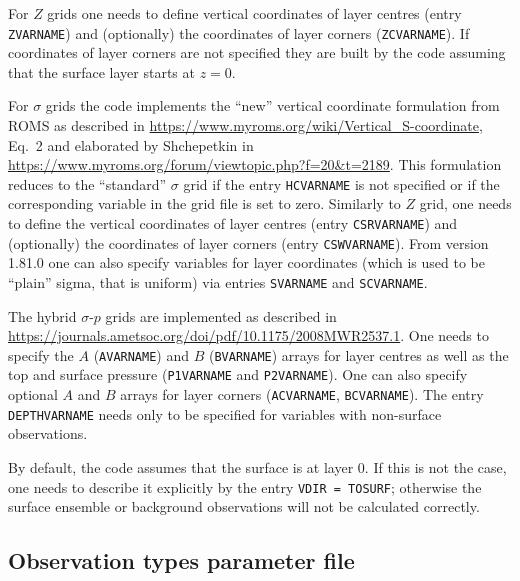 \documentclass[11pt]{report}
\begin{document}
For $Z$ grids one needs to define vertical coordinates of layer centres (entry \verb|ZVARNAME|) and (optionally) the coordinates of layer corners (\verb|ZCVARNAME|).
If coordinates of layer corners are not specified they are built by the code assuming that the surface layer starts at $z = 0$.

For $\sigma$ grids the code implements the ``new'' vertical coordinate formulation from ROMS as described in \url{https://www.myroms.org/wiki/Vertical_S-coordinate}, Eq.~2 and elaborated by Shchepetkin in \url{https://www.myroms.org/forum/viewtopic.php?f=20&t=2189}.
This formulation reduces to the ``standard'' $\sigma$ grid if the entry \verb|HCVARNAME| is not specified or if the corresponding variable in the grid file is set to zero.
Similarly to $Z$ grid, one needs to define the vertical coordinates of layer centres (entry \verb|CSRVARNAME|) and (optionally) the coordinates of layer corners (entry \verb|CSWVARNAME|).
From version 1.81.0 one can also specify variables for layer coordinates (which is used to be ``plain'' sigma, that is uniform) via entries \verb|SVARNAME| and \verb|SCVARNAME|.

The hybrid $\sigma$-$p$ grids are implemented as described in \url{https://journals.ametsoc.org/doi/pdf/10.1175/2008MWR2537.1}.
One needs to specify the $A$ (\verb|AVARNAME|) and $B$ (\verb|BVARNAME|) arrays for layer centres as well as the top and surface pressure (\verb|P1VARNAME| and \verb|P2VARNAME|).
One can also specify optional $A$ and $B$ arrays for layer corners (\verb|ACVARNAME|, \verb|BCVARNAME|).
The entry \verb|DEPTHVARNAME| needs only to be specified for variables with non-surface observations.

By default, the code assumes that the surface is at layer 0.
If this is not the case, one needs to describe it explicitly by the entry \verb|VDIR = TOSURF|; otherwise the surface ensemble or background observations will not be calculated correctly.

\subsection{Observation types parameter file}
\label{sec:obstypesprm}
\end{document}
